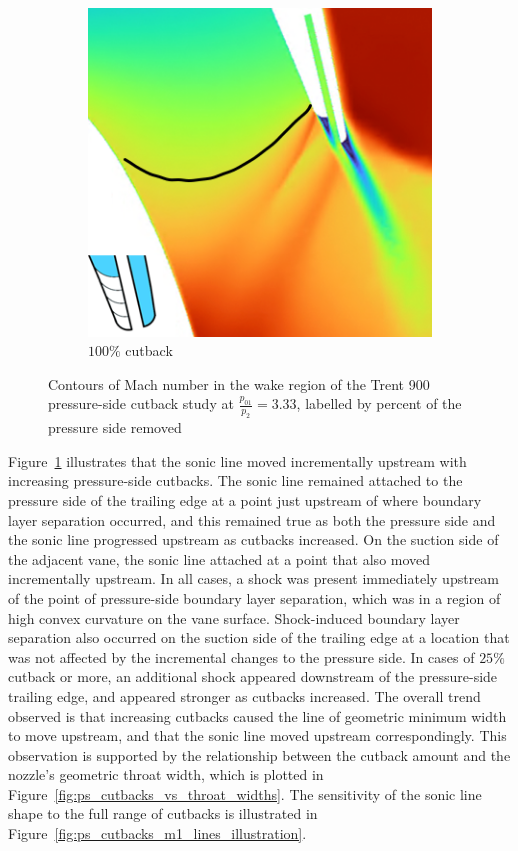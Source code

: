 \documentclass[a4paper, 11pt, oneside]{report}
\begin{document}
\begin{figure}[H]
\begin{subfigure}{.15\textwidth}
	\end{subfigure}
	\begin{subfigure}{.42\textwidth}
		\centering
		\includegraphics[width=\linewidth]{figs/ps_cutbacks_choked_100.png}
		\caption{$100\%$ cutback}
	\end{subfigure}
	\caption{Contours of Mach number in the wake region of the Trent 900 pressure-side cutback study at $\frac{p_{01}}{p_2}=3.33$, labelled by percent of the pressure side removed}
	\label{fig:ps_cutbacks_choked}
\end{figure}

Figure~\ref{fig:ps_cutbacks_choked} illustrates that the sonic line moved incrementally upstream with increasing pressure-side cutbacks. The sonic line remained attached to the pressure side of the trailing edge at a point just upstream of where boundary layer separation occurred, and this remained true as both the pressure side and the sonic line progressed upstream as cutbacks increased. On the suction side of the adjacent vane, the sonic line attached at a point that also moved incrementally upstream. In all cases, a shock was present immediately upstream of the point of pressure-side boundary layer separation, which was in a region of high convex curvature on the vane surface. Shock-induced boundary layer separation also occurred on the suction side of the trailing edge at a location that was not affected by the incremental changes to the pressure side. In cases of $25\%$ cutback or more, an additional shock appeared downstream of the pressure-side trailing edge, and appeared stronger as cutbacks increased. The overall trend observed is that increasing cutbacks caused the line of geometric minimum width to move upstream, and that the sonic line moved upstream correspondingly. This observation is supported by the relationship between the cutback amount and the nozzle's geometric throat width, which is plotted in Figure~\ref{fig:ps_cutbacks_vs_throat_widths}. The sensitivity of the sonic line shape to the full range of cutbacks is illustrated in Figure~\ref{fig:ps_cutbacks_m1_lines_illustration}.
\end{document}
